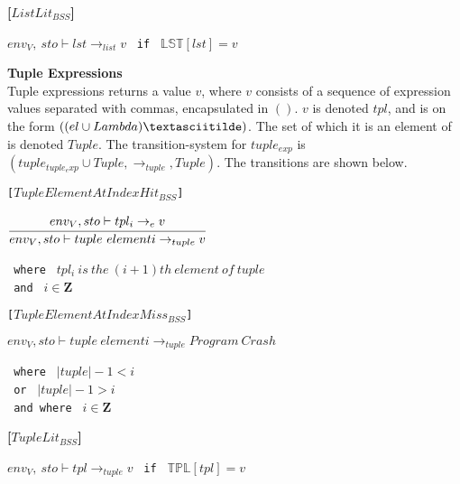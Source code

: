 \textbf{[$ListLit_{BSS}$]}
\begin{center}
	\begin{math}
	env_V,\ sto \vdash lst \rightarrow_{list} v
	\end{math}
	\texttt{ if } $\mathbb{LST}[lst] = v$
\end{center}

\textbf{\Large{Tuple Expressions}}\\
Tuple expressions returns a value $v$, where $v$ consists of a sequence of expression values separated with commas, encapsulated in $()$.
$v$ is denoted $tpl$, and is on the form $((el \cup Lambda)\textasciitilde)$.
The set of which it is an element of is denoted $Tuple$.
The transition-system for $tuple_{exp}$ is $(tuple_{tuple_exp} \cup Tuple, \rightarrow_{tuple}, Tuple)$.
The transitions are shown below.

\texttt{[$TupleElementAtIndexHit_{BSS}$]}
\begin{center}
	\begin{math}
	\cfrac
	{env_V, sto \vdash tpl_i \rightarrow_e v}
	{env_V, sto \vdash tuple\ element i \rightarrow_{tuple} v}
	\end{math}
	
	\texttt{ where } $tpl_i\ is\ the\ (i + 1)th\ element\ of\ tuple$\\
	\texttt{ and } $i \in \mathbf{Z}$
\end{center}

\texttt{[$TupleElementAtIndexMiss_{BSS}$]}
\begin{center}
	\begin{math}
	{env_V, sto \vdash tuple\ element i \rightarrow_{tuple} Program\ Crash}
	\end{math}
	
	\texttt{ where } $|tuple| - 1 < i$\\
	\texttt{ or } $|tuple| - 1 > i$\\
	\texttt{ and where } $i \in \mathbf{Z}$
\end{center}

\textbf{[$TupleLit_{BSS}$]}\\
\begin{center}
	\begin{math}
	env_V,\ sto \vdash tpl \rightarrow_{tuple} v
	\end{math}
	\texttt{ if } $\mathbb{TPL}[tpl] = v$
\end{center}

